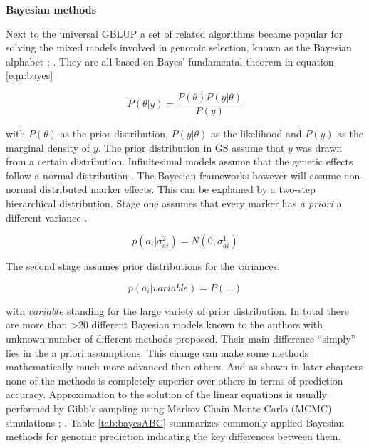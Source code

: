 \textbf{Bayesian methods} \newline 

Next to the universal GBLUP a set of related algorithms became popular for solving the mixed models involved in genomic selection, known as the Bayesian alphabet \cite{gianola2009}; \cite{gianola2013}. They are all based on Bayes' fundamental theorem in equation \ref{eqn:bayes}

\begin{equation}
P(\theta | y) = \frac{P(\theta )P(y | \theta)}{P(y)}  
\label{eqn:bayes}
\end{equation}

with $P(\theta )$ as the prior distribution, $P(y|\theta )$ as the likelihood and $P(y)$ as the marginal density of $y$. The prior distribution in GS assume that $y$ was drawn from a certain distribution. Infinitesimal models assume that the genetic effects follow a normal distribution \cite{legarra2018}. The Bayesian frameworks however will assume non-normal distributed marker effects. This can be explained by a two-step hierarchical distribution.
Stage one  assumes that every marker has \textit{a priori} a different variance \cite{legarra2018}.

\begin{equation}
p(a_i|\sigma_{ai}^2) = N (0,\sigma^1_{ai})
  \label{eqn:stageonbayes}
\end{equation}

The second stage assumes prior distributions for the variances.

\begin{equation}
p(a_i| variable ) = P(\dots )
  \label{eqn:stagetwobayes}
\end{equation}

with $variable$ standing for the large variety of prior distribution. In total there are more than >20
different Bayesian models known to the authors with unknown number of different methods proposed. Their main
difference ``simply'' lies in the a priori assumptions. This change can make some methods mathematically much
more advanced then others. And as shown in later chapters none of the methods is completely superior over
others in terms of prediction accuracy. Approximation to the solution of the linear equations is usually performed by Gibb's sampling using Markov Chain Monte Carlo (MCMC) simulations \cite{dlc2009}; \cite{BGLR}.
Table \ref{tab:bayesABC} summarizes commonly applied Bayesian methods for genomic prediction indicating the key differences between them. 

